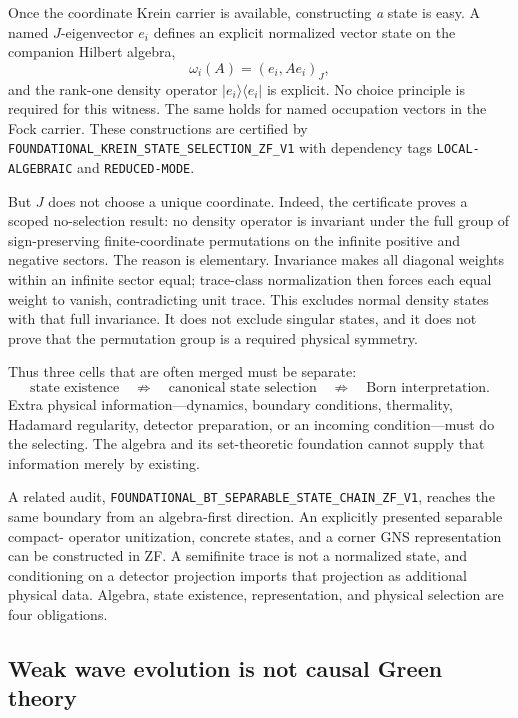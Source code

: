 \documentclass[11pt]{article}
\theoremstyle{definition}
\theoremstyle{remark}
\newcommand{\cert}[1]{\nolinkurl{#1}}
\newcommand{\rtype}[1]{\nolinkurl{#1}}
\begin{document}
Once the coordinate Krein carrier is available, constructing \emph{a} state
is easy.  A named \(J\)-eigenvector \(e_i\) defines an explicit normalized
vector state on the companion Hilbert algebra,
\[
              \omega_i(A)=(e_i,Ae_i)_J,
\]
and the rank-one density operator \(\lvert e_i\rangle\langle e_i\rvert\) is explicit.
No choice principle is required for this witness.  The same holds for named
occupation vectors in the Fock carrier.  These constructions are certified by
\cert{FOUNDATIONAL_KREIN_STATE_SELECTION_ZF_V1} with dependency tags
\rtype{LOCAL-ALGEBRAIC} and \rtype{REDUCED-MODE}.

But \(J\) does not choose a unique coordinate.  Indeed, the certificate proves
a scoped no-selection result: no density operator is invariant under the full
group of sign-preserving finite-coordinate permutations on the infinite
positive and negative sectors.  The reason is elementary.  Invariance makes
all diagonal weights within an infinite sector equal; trace-class
normalization then forces each equal weight to vanish, contradicting unit
trace.  This excludes normal density states with that full invariance.  It
does not exclude singular states, and it does not prove that the permutation
group is a required physical symmetry.

Thus three cells that are often merged must be separate:
\[
 \text{state existence}
 \quad\not\Rightarrow\quad
 \text{canonical state selection}
 \quad\not\Rightarrow\quad
 \text{Born interpretation}.
\]
Extra physical information---dynamics, boundary conditions, thermality,
Hadamard regularity, detector preparation, or an incoming condition---must do
the selecting.  The algebra and its set-theoretic foundation cannot supply
that information merely by existing.

A related audit,
\cert{FOUNDATIONAL_BT_SEPARABLE_STATE_CHAIN_ZF_V1}, reaches the same boundary
from an algebra-first direction.  An explicitly presented separable compact-
operator unitization, concrete states, and a corner GNS representation can be
constructed in ZF.  A semifinite trace is not a normalized state, and
conditioning on a detector projection imports that projection as additional
physical data.  Algebra, state existence, representation, and physical
selection are four obligations.

\subsection{Weak wave evolution is not causal Green theory}
\end{document}
